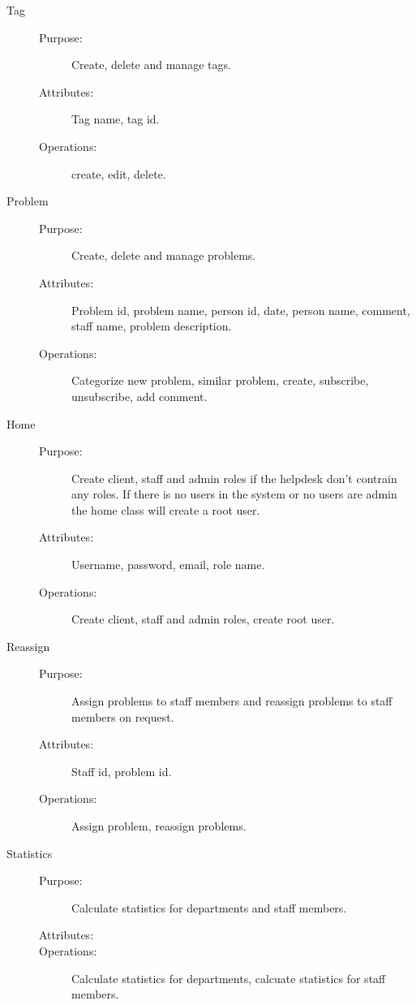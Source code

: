 \begin{description}
\item[Tag]\hfill
\begin{description}
\item[Purpose:]Create, delete and manage tags.
\item[Attributes:]Tag name, tag id.
\item[Operations:]create, edit, delete.
\end{description}
\end{description}

\begin{description}
\item[Problem]\hfill
\begin{description}
\item[Purpose:]Create, delete and manage problems.
\item[Attributes:]Problem id, problem name, person id, date, person name, comment, staff name, problem description.
\item[Operations:]Categorize new problem, similar problem, create, subscribe, unsubscribe, add comment.
\end{description}
\end{description}

\begin{description}
\item[Home]\hfill
\begin{description}
\item[Purpose:]Create client, staff and admin roles if the helpdesk don't contrain any roles. If there is no users in the system or no users are admin the home class will create a root user.
\item[Attributes:] Username, password, email, role name.
\item[Operations:] Create client, staff and admin roles, create root user.
\end{description}
\end{description}

\begin{description}
\item[Reassign]\hfill
\begin{description}
\item[Purpose:] Assign problems to staff members and reassign problems to staff members on request.
\item[Attributes:] Staff id, problem id.
\item[Operations:] Assign problem, reassign problems.
\end{description}
\end{description}

\begin{description}
\item[Statistics]\hfill
\begin{description}
\item[Purpose:] Calculate statistics for departments and staff members.
\item[Attributes:] 
\item[Operations:] Calculate statistics for departments, calcuate statistics for staff members.
\end{description}
\end{description}